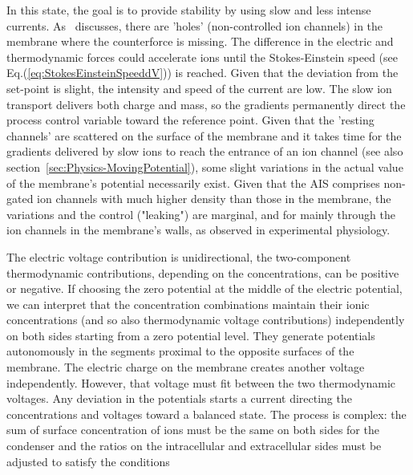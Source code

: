 
In this state, the goal is to provide stability by using slow and less intense currents. 
As~\cite{PrinciplesNeuralScience:2013} discusses, there are 'holes' (non-controlled ion channels) in the membrane where the counterforce is missing.
The difference in the electric and thermodynamic forces could accelerate ions until the Stokes-Einstein  speed (see Eq.(\ref{eq:StokesEinsteinSpeeddV})) is reached.
Given that the deviation from the set-point is slight, the intensity and speed of the current are low.
The slow ion transport delivers both charge and mass, so the gradients
permanently direct the process control variable toward the reference point. Given that the 'resting channels' are scattered on the surface of the membrane and it takes time for the gradients delivered by slow ions to reach the entrance of an ion channel (see also section~\ref{sec:Physics-MovingPotential}), some slight variations 
in the actual value of the membrane's potential necessarily exist.
Given that the 
\gls{AIS}
comprises non-gated ion channels with much higher density than those in the membrane, the variations and the control ("leaking") are marginal, and for mainly through the ion channels in the membrane's walls, as observed in experimental physiology.

The electric voltage contribution is unidirectional, the two-component thermodynamic contributions, depending on the concentrations, can be positive or negative.
If choosing the zero potential at the middle of the electric potential, we can interpret that
the concentration combinations maintain their ionic concentrations (and so also thermodynamic voltage contributions) independently on both sides starting from a zero potential level. They generate potentials autonomously in the segments proximal to the opposite surfaces of the membrane. The electric charge on the membrane creates another voltage independently. However, that voltage must fit between the two thermodynamic voltages. Any deviation in the potentials starts a current directing the concentrations and voltages toward a balanced state.
The process is complex: the sum of surface concentration of ions must be the same on both sides for the condenser and the ratios on the intracellular and extracellular sides must be adjusted to satisfy the conditions 

